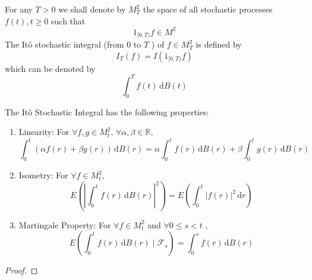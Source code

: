 \begin{definition}
    For any $T>0$ we shall denote by $M_{T}^{2}$ the space of all stochastic processes $f(t), t \geq 0$ such that
    \begin{equation*}
        1_{[0,T)}f\in M^{2}
    \end{equation*}
    The It\^o stochastic integral (from $0$ to $T$ ) of $f\in M_{T}^{2}$ is defined by
    \begin{equation}
        I_{T}(f)=I\left(1_{[0,T)}f\right)
    \end{equation}
    which can be denoted by
    \begin{equation}
        \int_{0}^{T}f(t)\,\mathrm{d}B(t)
    \end{equation}
\end{definition}

\begin{property}
    The It\^o Stochastic Integral has the following properties:
    \begin{enumerate}
        \item Linearity: For $\forall f,g\in M_{t}^{2}$, $\forall \alpha,\beta\in\mathbb{R}$,
              \begin{equation}
                  \int_{0}^{t}(\alpha f(r)+\beta g(r))\,\mathrm{d}B(r)=\alpha \int_{0}^{t}f(r)\,\mathrm{d}B(r)+\beta\int_{0}^{t}g(r)\,\mathrm{d}B(r)
              \end{equation}
        \item Isometry: For $\forall f\in M_{t}^{2}$,
              \begin{equation}
                  E\left(\left|\int_{0}^{t}f(r)\,\mathrm{d}B(r)\right|^{2}\right)=E\left(\int_{0}^{t}|f(r)|^{2}\,\mathrm{d}r\right)
              \end{equation}
        \item Martingale Property: For $\forall f\in M_{t}^{2}$ and  $\forall 0\leq s<t$ ,
              \begin{equation}
                  E\left(\int_{0}^{t}f(r)\,\mathrm{d}B(r)\mid\mathcal{F}_{s}\right)=\int_{0}^{s}f(r)\,\mathrm{d}B(r)
              \end{equation}
    \end{enumerate}
\end{property}

\begin{proof}

\end{proof}

